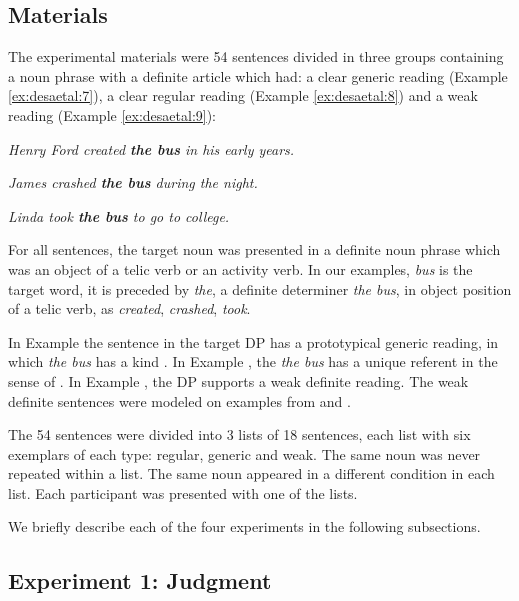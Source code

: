 \documentclass[output=paper,
modfonts
]{langscibook}
\begin{document}
\subsection{Materials} \label{sec:desaetal:4.1}

The experimental materials were 54 sentences divided in three groups containing a noun phrase with a definite article which had: a clear generic reading (Example \ref{ex:desaetal:7}), a clear regular reading (Example \ref{ex:desaetal:8}) and a weak reading (Example \ref{ex:desaetal:9}):


\ea \label{ex:desaetal:7}
\textit{Henry Ford created \textbf{the bus} in his early years.}
\z

\ea \label{ex:desaetal:8}
\textit{James crashed \textbf{the bus} during the night.}
\z

\ea \label{ex:desaetal:9}
\textit{Linda took \textbf{the bus} to go to college.}
\z

For all sentences, the target noun was presented in a definite noun phrase which was an object of a telic verb or an activity verb. In our examples, \textit{bus} is the target word, it is preceded by \textit{the}, a definite determiner \textit{the bus}, in object position of a telic verb, as \textit{created}, \textit{crashed}, \textit{took}.

In Example  the sentence in the target DP has a prototypical generic reading, in which \textit{the bus}  has a kind  \citep[cf.][]{CarlsonPelletier1995,Carlson2006}. In Example , the \textit{the bus} has a unique referent in the sense of \citet{Russell1905}. In  Example , the DP supports a weak definite reading. The weak definite sentences were modeled on examples from \citet{CarlsonSussman2005,CarlsonEtAlii2006,CarlsonEtAlii2013} and \citet{KleinEtAlii2013}.

The 54 sentences were divided into 3 lists of 18 sentences, each list with six exemplars of each type: regular, generic and weak. The same noun was never repeated within a list. The same noun appeared in a different condition in each list. Each participant was presented with one of the lists. 

We briefly describe each of the four experiments in the following subsections.


\subsection{Experiment 1: Judgment}
\end{document}
